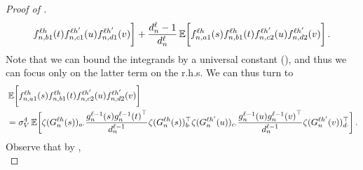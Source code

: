 \begin{proof}[Proof of ]
\begin{align*}
            {f}^{\ell h}_{n, b 1}{(t)}
            {f}^{\ell h'}_{n, c 1}{(u)} 
            {f}^{\ell h'}_{n, d 1}{(v)}
        \biggr]
        +
        \frac{d_{n}^{\ell} - 1}{d_{n}^{\ell}}
        \operatorname*{\mathbb{E}} \biggl[
            {f}^{\ell h}_{n, a 1}{(s)} 
            {f}^{\ell h}_{n, b 1}{(t)}
            {f}^{\ell h'}_{n, c 2}{(u)} 
            {f}^{\ell h'}_{n, d 2}{(v)}
        \biggr]
        \, .
    \end{align*}
    Note that we can bound the integrands by a universal constant (), and thus we can focus only on the latter term on the r.h.s.
    We can thus turn to
    \begin{align*}%
        &\E \biggl[
            \indexedActivation{\depthSymbol \headIndex}{\sequenceVariable, a 1}{s} 
            \indexedActivation{\depthSymbol \headIndex}{\sequenceVariable, b 1}{t}
            \indexedActivation{\depthSymbol \headIndex'}{\sequenceVariable, c 2}{u} 
            \indexedActivation{\depthSymbol \headIndex'}{\sequenceVariable, d 2}{v}
        \biggr]
        \\
        &=
        \valueStd^4
        \E \biggl[
            \softmax(\logitSymbol_{\sequenceVariable}^{\depthSymbol \headIndex} (s))_{a \cdot} 
            \frac{
                \indexedActivity{\depthSymbol - 1}{\sequenceVariable}{s}
                \indexedActivity{\depthSymbol - 1}{\sequenceVariable}{t}^\top
            }{
                \layerDimension{\depthSymbol - 1}
            }
            \softmax(\logitSymbol_{\sequenceVariable}^{\depthSymbol \headIndex} (s))_{b \cdot}^\top
            \softmax(\logitSymbol_{\sequenceVariable}^{\depthSymbol \headIndex'} (u))_{c \cdot}
            \frac{
                \indexedActivity{\depthSymbol - 1}{\sequenceVariable}{u}
                \indexedActivity{\depthSymbol - 1}{\sequenceVariable}{v}^\top
            }{
                \layerDimension{\depthSymbol - 1}
            }
            \softmax(\logitSymbol_{\sequenceVariable}^{\depthSymbol \headIndex'} (v))_{d \cdot}^\top
        \biggr]
        \nonumber
        \, .
    \end{align*}
    Observe that by , 
    \begin{equation*}

\end{equation*}
\end{proof}
